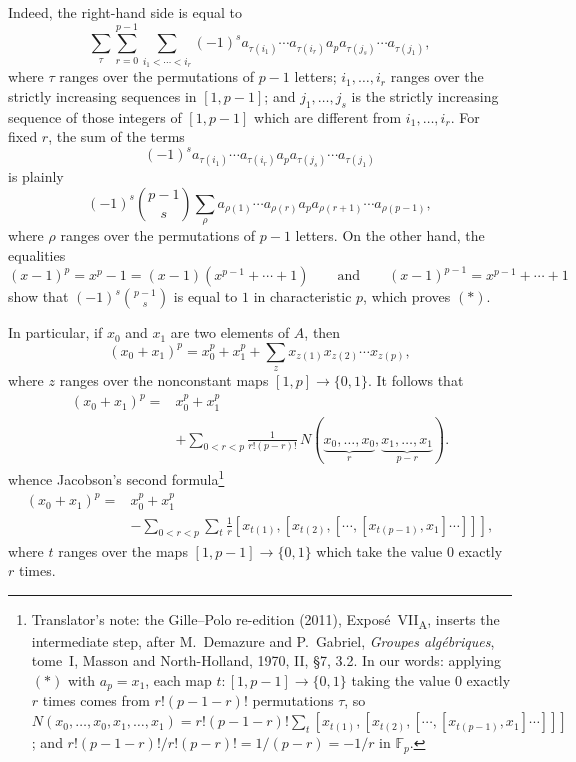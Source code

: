 Indeed, the right-hand side is equal to
\[
  \sum_{\tau}
  \sum_{r=0}^{p-1}
  \sum_{i_1<\cdots<i_r}
  (-1)^s
  a_{\tau(i_1)}\cdots a_{\tau(i_r)}
  a_p
  a_{\tau(j_s)}\cdots a_{\tau(j_1)},
\]
where \(\tau\) ranges over the permutations of \(p-1\) letters;
\(i_1,\ldots,i_r\) ranges over the strictly increasing sequences
in \([1,p-1]\); and \(j_1,\ldots,j_s\) is the strictly increasing
sequence of those integers of \([1,p-1]\) which are different
from \(i_1,\ldots,i_r\). For fixed \(r\), the sum of the terms
\[
  (-1)^s
  a_{\tau(i_1)}\cdots a_{\tau(i_r)}
  a_p
  a_{\tau(j_s)}\cdots a_{\tau(j_1)}
\]
is plainly
\[
  (-1)^s\binom{p-1}{s}
  \sum_{\rho}
  a_{\rho(1)}\cdots a_{\rho(r)}
  a_p
  a_{\rho(r+1)}\cdots a_{\rho(p-1)},
\]
where \(\rho\) ranges over the permutations of \(p-1\) letters. On
the other hand, the equalities
\[
  (x-1)^p=x^p-1=(x-1)(x^{p-1}+\cdots+1)
  \qquad\text{and}\qquad
  (x-1)^{p-1}=x^{p-1}+\cdots+1
\]
show that \((-1)^s\binom{p-1}{s}\) is equal to \(1\) in characteristic
\(p\), which proves \((*)\).

In particular, if \(x_0\) and \(x_1\) are two elements of \(A\), then
\[
  (x_0+x_1)^p
  =
  x_0^p+x_1^p+
  \sum_z x_{z(1)}x_{z(2)}\cdots x_{z(p)},
\]
where \(z\) ranges over the nonconstant maps
\([1,p]\to\{0,1\}\). It follows that
\[
\begin{aligned}
  (x_0+x_1)^p
  ={}&
  x_0^p+x_1^p \\
  &+
  \sum_{0<r<p}
  \frac{1}{r!(p-r)!}\,
  N(
    \underbrace{x_0,\ldots,x_0}_{r},
    \underbrace{x_1,\ldots,x_1}_{p-r}
  ).
\end{aligned}
\]
whence Jacobson's second formula\footnote{Translator's note: the
Gille--Polo re-edition (2011), Expos\'e~VII\textsubscript{A}, inserts the
intermediate step, after M.~Demazure and P.~Gabriel, \textit{Groupes
alg\'ebriques}, tome~I, Masson and North-Holland, 1970, II, \S7, 3.2. In
our words: applying \((*)\) with \(a_p=x_1\), each map
\(t:[1,p-1]\to\{0,1\}\) taking the value \(0\) exactly \(r\) times comes
from \(r!(p-1-r)!\) permutations \(\tau\), so
\(N(x_0,\ldots,x_0,x_1,\ldots,x_1)=r!(p-1-r)!\sum_t
[x_{t(1)},[x_{t(2)},[\cdots,[x_{t(p-1)},x_1]\cdots]]]\); and
\(r!(p-1-r)!/r!(p-r)!=1/(p-r)=-1/r\) in \(\mathbb F_p\).}
\begin{equation}
  \tag{ii}\label{sga3:vii:paragraph:5-1:equation:ii}
\begin{aligned}
  (x_0+x_1)^p
  ={}&
  x_0^p+x_1^p \\
  &-
  \sum_{0<r<p}\sum_t\frac1r
  [x_{t(1)},
    [x_{t(2)},
      [\cdots,
        [x_{t(p-1)},x_1]
      \cdots]
    ]
  ],
\end{aligned}
\end{equation}
where \(t\) ranges over the maps \([1,p-1]\to\{0,1\}\) which take the
value \(0\) exactly \(r\) times.

